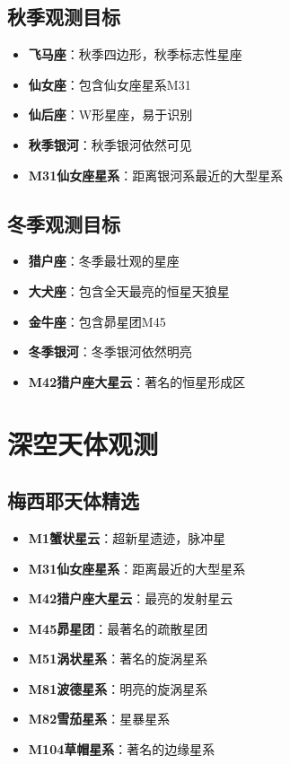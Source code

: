 \documentclass[12pt,UTF8]{ctexbook}
\begin{document}
\section{秋季观测目标}

\begin{itemize}
  \item \textbf{飞马座}：秋季四边形，秋季标志性星座
  \item \textbf{仙女座}：包含仙女座星系M31
  \item \textbf{仙后座}：W形星座，易于识别
  \item \textbf{秋季银河}：秋季银河依然可见
  \item \textbf{M31仙女座星系}：距离银河系最近的大型星系
\end{itemize}

\section{冬季观测目标}

\begin{itemize}
  \item \textbf{猎户座}：冬季最壮观的星座
  \item \textbf{大犬座}：包含全天最亮的恒星天狼星
  \item \textbf{金牛座}：包含昴星团M45
  \item \textbf{冬季银河}：冬季银河依然明亮
  \item \textbf{M42猎户座大星云}：著名的恒星形成区
\end{itemize}

\chapter{深空天体观测}
\section{梅西耶天体精选}

\begin{itemize}
  \item \textbf{M1蟹状星云}：超新星遗迹，脉冲星
  \item \textbf{M31仙女座星系}：距离最近的大型星系
  \item \textbf{M42猎户座大星云}：最亮的发射星云
  \item \textbf{M45昴星团}：最著名的疏散星团
  \item \textbf{M51涡状星系}：著名的旋涡星系
  \item \textbf{M81波德星系}：明亮的旋涡星系
  \item \textbf{M82雪茄星系}：星暴星系
  \item \textbf{M104草帽星系}：著名的边缘星系
\end{itemize}
\end{document}

